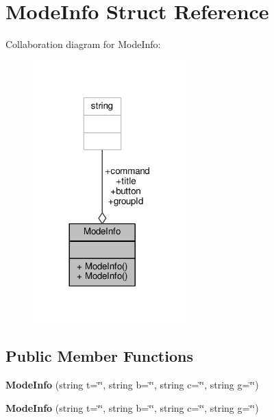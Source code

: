 \hypertarget{structModeInfo}{}\section{Mode\+Info Struct Reference}
\label{structModeInfo}


Collaboration diagram for Mode\+Info\+:
\nopagebreak
\begin{figure}[H]
\begin{center}
\leavevmode
\includegraphics[width=168pt]{d0/de7/structModeInfo__coll__graph}
\end{center}
\end{figure}
\subsection*{Public Member Functions}
\begin{DoxyCompactItemize}
\item 
{\bfseries Mode\+Info} (string t=\char`\"{}\char`\"{}, string b=\char`\"{}\char`\"{}, string c=\char`\"{}\char`\"{}, string g=\char`\"{}\char`\"{})\hypertarget{structModeInfo_ab99e615908d1f3466ef355920f97071f}{}\label{structModeInfo_ab99e615908d1f3466ef355920f97071f}

\item 
{\bfseries Mode\+Info} (string t=\char`\"{}\char`\"{}, string b=\char`\"{}\char`\"{}, string c=\char`\"{}\char`\"{}, string g=\char`\"{}\char`\"{})\hypertarget{structModeInfo_ab99e615908d1f3466ef355920f97071f}{}\label{structModeInfo_ab99e615908d1f3466ef355920f97071f}

\end{DoxyCompactItemize}
